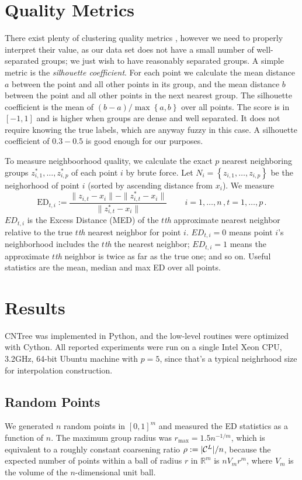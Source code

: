 \documentclass[11pt]{article}
\newcommand{\lb}{\left\{}
\newcommand{\rb}{\right\}}
\newcommand{\Real}{\mathbb{R}}
\newcommand{\rmax}{r_{\text{max}}}
\newcommand{\cC}{{\cal C}}
\newcommand{\ze}{z^*}
\begin{document}
\section{Quality Metrics}
\label{metrics}
There exist plenty of clustering quality metrics \cite[Sec.~2.3.9]{sklearn_clustering}, however we need to properly interpret their value, as our data set does not have a small number of well-separated groups; we just wish to have reasonably separated groups. A simple metric is the {\it silhouette coefficient}. For each point we calculate the mean distance $a$ between the point and all other points in its group, and the mean distance $b$ between the point and all other points in the next nearest group. The silhouette coefficient is the mean of $(b-a)/\max\lb a,b \rb$ over all points. The score is in $[-1,1]$ and is higher when groups are dense and well separated. It does not require knowing the true labels, which are anyway fuzzy in this case. A silhouette coefficient of $0.3-0.5$ is good enough for our purposes.

To measure neighboorhood quality, we calculate the exact $p$ nearest neighboring groups $\ze_{i,1},\dots,\ze_{i,p}$ of each point $i$ by brute force. Let $N_i = \left\{z_{i,1},\dots,z_{i,p}\rb $ be the neighorhood of point $i$ (sorted by ascending distance from $x_i$). We measure
\begin{equation}
	\text{ED}_{t,i} := \frac{\|z_{i,t} - x_i\| - \|\ze_{i,t} - x_i\|}{\|\ze_{i,t} - x_i\|}\,\qquad i=1,\dots,n\,, t=1,\dots,p\,.
\end{equation}
$ED_{t,i}$ is the Excess Distance (MED) of the $t${\it th} approximate nearest neighbor relative to the true $t${\it th} nearest neighbor for point $i$. $ED_{t,i} = 0$ means point $i$'s neighborhood includes the $t${\it th} the nearest neighbor; $ED_{t,i}=1$ means the approximate $t${\it th} neighbor is twice as far as the true one; and so on. Useful statistics are the mean, median and max ED over all points. 

\section{Results}
CNTree was implemented in Python, and the low-level routines were optimized with Cython. All reported experiments were run on a single Intel Xeon CPU, 3.2GHz, 64-bit Ubuntu machine with $p=5$, since that's a typical neighrhood size for interpolation construction.

\subsection{Random Points}
We generated $n$ random points in $[0,1]^m$ and measured the ED statistics as a function of $n$. The maximum group radius was $\rmax = 1.5 n^{-1/m}$, which is equivalent to a roughly constant coarsening ratio $\rho := |\cC^L|/n$, because the expected number of points within a ball of radius $r$ in $\Real^m$ is $n V_m r^m$, where $V_m$ is the volume of the $n$-dimensional unit ball.
\end{document}
